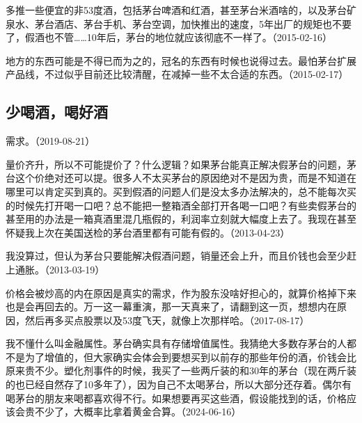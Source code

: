 
多推一些便宜的非53度酒，包括茅台啤酒和红酒，甚至茅台米酒啥的，以及茅台矿泉水、茅台酒店、茅台手机、茅台空调，加快推出的速度，5年出厂的规矩也不要了，假酒也不管……10年后，茅台的地位就应该彻底不一样了。（2015-02-16）


地方的东西可能是不得已而为之的，冠名的东西有时候也说得过去。最怕茅台扩展产品线，不过似乎目前还比较清醒，在减掉一些不太合适的东西。（2015-02-17）

\subsection{少喝酒，喝好酒}


需求。（2019-08-21）


量价齐升，所以不可能提价了？什么逻辑？如果茅台能真正解决假茅台的问题，茅台这个价绝对还可以提。很多人不太买茅台的原因绝对不是因为贵，而是不知道在哪里可以肯定买到真的。买到假酒的问题人们是没太多办法解决的，总不能每次买的时候先打开喝一口吧？总不能把一整箱酒全部打开各喝一口吧？有些卖假茅台的甚至用的办法是一箱真酒里混几瓶假的，利润率立刻就大幅度上去了。我现在甚至怀疑我上次在美国送检的茅台酒里都有可能有假的。（2013-04-23）


我没算过，但认为茅台只要能解决假酒问题，销量还会上升，而且价钱也会至少赶上通胀。（2013-03-19）

价格会被炒高的内在原因是真实的需求，作为股东没啥好担心的，就算价格掉下来也是会再回去的。万一这一幕重演，那一天真来了，请翻到这一页，想想内在原因，然后再多买点股票以及53度飞天，就像上次那样哈。（2017-08-17）

我不懂什么叫金融属性。茅台确实具有存储增值属性。我猜绝大多数存茅台的人都不是为了增值的，但大家确实会体会到要想买到以前存的那些年份的酒，价钱会比原来贵不少。塑化剂事件的时候，我买了一些两斤装的和30年的茅台（现在两斤装的也已经自然存了10多年了），因为自己不太喝茅台，所以大部分还存着。偶尔有喝茅台的朋友来喝都喜欢得不行。如果想要再买这些酒，假设能找到的话，价格应该会贵不少了，大概率比拿着黄金合算。（2024-06-16）

